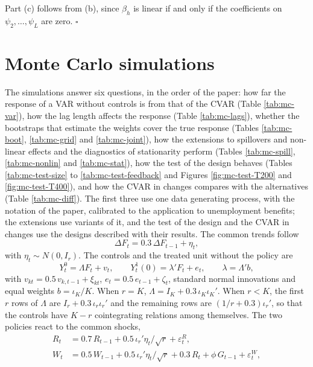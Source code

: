 \documentclass[12pt,a4paper]{article}
\theoremstyle{definition}
\begin{document}
Part (c) follows from (b), since $\beta_h$ is linear if and only if the coefficients on $\psi_2,\dots,\psi_L$ are zero. $\square$


\section{Monte Carlo simulations\label{sec:montecarlo}}

The simulations answer six questions, in the order of the paper: how far the response of a VAR without controls is from that of the CVAR (Table \ref{tab:mc-var}), how the lag length affects the response (Table \ref{tab:mc-lags}), whether the bootstraps that estimate the weights cover the true response (Tables \ref{tab:mc-boot}, \ref{tab:mc-grid} and \ref{tab:mc-joint}), how the extensions to spillovers and non-linear effects and the diagnostics of stationarity perform (Tables \ref{tab:mc-spill}, \ref{tab:mc-nonlin} and \ref{tab:mc-stat}), how the test of the design behaves (Tables \ref{tab:mc-test-size} to \ref{tab:mc-test-feedback} and Figures \ref{fig:mc-test-T200} and \ref{fig:mc-test-T400}), and how the CVAR in changes compares with the alternatives (Table \ref{tab:mc-diff}). The first three use one data generating process, with the notation of the paper, calibrated to the application to unemployment benefits; the extensions use variants of it, and the test of the design and the CVAR in changes use the designs described with their results. The common trends follow
\begin{equation}
\Delta F_t=0.3\,\Delta F_{t-1}+\eta_t,
\end{equation}
with $\eta_t\sim N(0,I_r)$. The controls and the treated unit without the policy are
\begin{equation}
Y^0_t=\Lambda F_t+v_t,\qquad Y^1_t(0)=\lambda'F_t+e_t,\qquad \lambda=\Lambda'b,
\end{equation}
with $v_{kt}=0.5\,v_{k,t-1}+\xi_{kt}$, $e_t=0.5\,e_{t-1}+\zeta_t$, standard normal innovations and equal weights $b=\iota_K/K$. When $r=K$, $\Lambda=I_K+0.3\,\iota_K\iota_K'$. When $r<K$, the first $r$ rows of $\Lambda$ are $I_r+0.3\,\iota_r\iota_r'$ and the remaining rows are $(1/r+0.3)\iota_r'$, so that the controls have $K-r$ cointegrating relations among themselves. The two policies react to the common shocks,
\begin{align}
R_t&=0.7\,R_{t-1}+0.5\,\iota_r'\eta_t/\sqrt{r}+\varepsilon^R_t,\\
W_t&=0.5\,W_{t-1}+0.5\,\iota_r'\eta_t/\sqrt{r}+0.3\,R_t+\phi\,G_{t-1}+\varepsilon^W_t,
\end{align}
\end{document}
